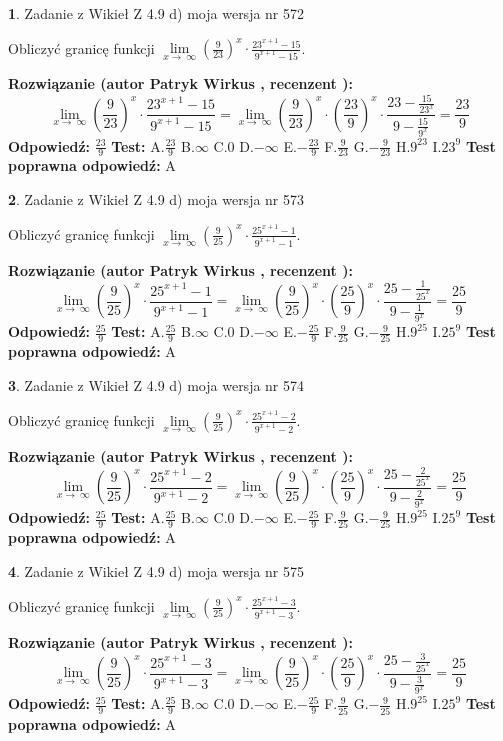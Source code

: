 \documentclass[12pt, a4paper]{article}
\theoremstyle{definition} %
\newtheorem{zad}{}
\newcommand{\zadStart}[1]{\begin{zad}#1\newline}
\newcommand{\zadStop}{\end{zad}}
\newcommand{\rozwStart}[2]{\noindent \textbf{Rozwiązanie (autor #1 , recenzent #2): }\newline}
\newcommand{\rozwStop}{\newline}
\newcommand{\odpStart}{\noindent \textbf{Odpowiedź:}\newline}
\newcommand{\odpStop}{\newline}
\newcommand{\testStart}{\noindent \textbf{Test:}\newline}
\newcommand{\testStop}{\newline}
\newcommand{\kluczStart}{\noindent \textbf{Test poprawna odpowiedź:}\newline}
\newcommand{\kluczStop}{\newline}
\begin{document}
\zadStart{Zadanie z Wikieł Z 4.9 d) moja wersja nr 572}


Obliczyć granicę funkcji  $\lim\limits_{x\to\ \infty}(\frac{9}{23})^{x}\cdot\frac{23^{x+1}-15}{9^{x+1}-15}$.
\zadStop
\rozwStart{Patryk Wirkus}{}
$$\lim\limits_{x\to\ \infty}(\frac{9}{23})^{x}\cdot\frac{23^{x+1}-15}{9^{x+1}-15}=\lim\limits_{x\to\ \infty}(\frac{9}{23})^{x}\cdot(\frac{23}{9})^{x} \cdot \frac{23-\frac{15}{23^{x}}}{9-\frac{15}{9^{x}}} = \frac{23}{9}$$
\rozwStop
\odpStart
$\frac{23}{9}$
\odpStop
\testStart
A.$\frac{23}{9}$ B.$\infty$ C.$0$ D.$-\infty$ E.$-\frac{23}{9}$
F.$\frac{9}{23}$ G.$-\frac{9}{23}$
H.$9^{23}$
I.$23^{9}$
\testStop
\kluczStart
A
\kluczStop



\zadStart{Zadanie z Wikieł Z 4.9 d) moja wersja nr 573}


Obliczyć granicę funkcji  $\lim\limits_{x\to\ \infty}(\frac{9}{25})^{x}\cdot\frac{25^{x+1}-1}{9^{x+1}-1}$.
\zadStop
\rozwStart{Patryk Wirkus}{}
$$\lim\limits_{x\to\ \infty}(\frac{9}{25})^{x}\cdot\frac{25^{x+1}-1}{9^{x+1}-1}=\lim\limits_{x\to\ \infty}(\frac{9}{25})^{x}\cdot(\frac{25}{9})^{x} \cdot \frac{25-\frac{1}{25^{x}}}{9-\frac{1}{9^{x}}} = \frac{25}{9}$$
\rozwStop
\odpStart
$\frac{25}{9}$
\odpStop
\testStart
A.$\frac{25}{9}$ B.$\infty$ C.$0$ D.$-\infty$ E.$-\frac{25}{9}$
F.$\frac{9}{25}$ G.$-\frac{9}{25}$
H.$9^{25}$
I.$25^{9}$
\testStop
\kluczStart
A
\kluczStop



\zadStart{Zadanie z Wikieł Z 4.9 d) moja wersja nr 574}


Obliczyć granicę funkcji  $\lim\limits_{x\to\ \infty}(\frac{9}{25})^{x}\cdot\frac{25^{x+1}-2}{9^{x+1}-2}$.
\zadStop
\rozwStart{Patryk Wirkus}{}
$$\lim\limits_{x\to\ \infty}(\frac{9}{25})^{x}\cdot\frac{25^{x+1}-2}{9^{x+1}-2}=\lim\limits_{x\to\ \infty}(\frac{9}{25})^{x}\cdot(\frac{25}{9})^{x} \cdot \frac{25-\frac{2}{25^{x}}}{9-\frac{2}{9^{x}}} = \frac{25}{9}$$
\rozwStop
\odpStart
$\frac{25}{9}$
\odpStop
\testStart
A.$\frac{25}{9}$ B.$\infty$ C.$0$ D.$-\infty$ E.$-\frac{25}{9}$
F.$\frac{9}{25}$ G.$-\frac{9}{25}$
H.$9^{25}$
I.$25^{9}$
\testStop
\kluczStart
A
\kluczStop



\zadStart{Zadanie z Wikieł Z 4.9 d) moja wersja nr 575}


Obliczyć granicę funkcji  $\lim\limits_{x\to\ \infty}(\frac{9}{25})^{x}\cdot\frac{25^{x+1}-3}{9^{x+1}-3}$.
\zadStop
\rozwStart{Patryk Wirkus}{}
$$\lim\limits_{x\to\ \infty}(\frac{9}{25})^{x}\cdot\frac{25^{x+1}-3}{9^{x+1}-3}=\lim\limits_{x\to\ \infty}(\frac{9}{25})^{x}\cdot(\frac{25}{9})^{x} \cdot \frac{25-\frac{3}{25^{x}}}{9-\frac{3}{9^{x}}} = \frac{25}{9}$$
\rozwStop
\odpStart
$\frac{25}{9}$
\odpStop
\testStart
A.$\frac{25}{9}$ B.$\infty$ C.$0$ D.$-\infty$ E.$-\frac{25}{9}$
F.$\frac{9}{25}$ G.$-\frac{9}{25}$
H.$9^{25}$
I.$25^{9}$
\testStop
\kluczStart
A
\kluczStop
\end{document}
